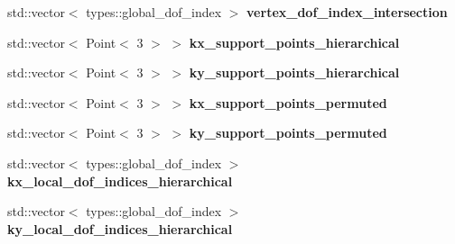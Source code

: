 \begin{DoxyCompactItemize}
\item 
\mbox{\label{structLaplaceBEM_1_1PairCellWiseScratchData_a2001013e06428347d301c51380dfe9c8}} 
std\+::vector$<$ types\+::global\+\_\+dof\+\_\+index $>$ {\bfseries vertex\+\_\+dof\+\_\+index\+\_\+intersection}
\item 
\mbox{\label{structLaplaceBEM_1_1PairCellWiseScratchData_a3d2f3d03a4c9edd68c5b6e23707a0284}} 
std\+::vector$<$ Point$<$ 3 $>$ $>$ {\bfseries kx\+\_\+support\+\_\+points\+\_\+hierarchical}
\item 
\mbox{\label{structLaplaceBEM_1_1PairCellWiseScratchData_ab87c5e42ccd17d45d97052bda9576dce}} 
std\+::vector$<$ Point$<$ 3 $>$ $>$ {\bfseries ky\+\_\+support\+\_\+points\+\_\+hierarchical}
\item 
\mbox{\label{structLaplaceBEM_1_1PairCellWiseScratchData_a32b2da930b6ad0488446e5b28da7565d}} 
std\+::vector$<$ Point$<$ 3 $>$ $>$ {\bfseries kx\+\_\+support\+\_\+points\+\_\+permuted}
\item 
\mbox{\label{structLaplaceBEM_1_1PairCellWiseScratchData_a998570a30f2cf4069e2e08430b253ead}} 
std\+::vector$<$ Point$<$ 3 $>$ $>$ {\bfseries ky\+\_\+support\+\_\+points\+\_\+permuted}
\item 
\mbox{\label{structLaplaceBEM_1_1PairCellWiseScratchData_a2f1f9ec98f5c725bef002e01259d95a2}} 
std\+::vector$<$ types\+::global\+\_\+dof\+\_\+index $>$ {\bfseries kx\+\_\+local\+\_\+dof\+\_\+indices\+\_\+hierarchical}
\item 
\mbox{\label{structLaplaceBEM_1_1PairCellWiseScratchData_a04052a9ef0a6f5ab440ffed7c1727e32}} 
std\+::vector$<$ types\+::global\+\_\+dof\+\_\+index $>$ {\bfseries ky\+\_\+local\+\_\+dof\+\_\+indices\+\_\+hierarchical}
\item 
\mbox{\label{structLaplaceBEM_1_1PairCellWiseScratchData_a5292871002dbf2bb4fdf33b255123862}} 

\end{DoxyCompactItemize}
